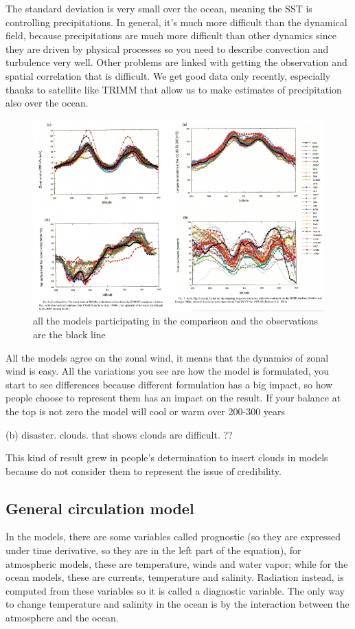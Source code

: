 The standard deviation is very small over the ocean, meaning the SST is controlling precipitations. 
In general, it's much more difficult than the dynamical field, because precipitations are much more difficult than other dynamics since they are driven by physical processes so you need to describe convection and turbulence very well. Other problems are linked with getting the observation and spatial correlation that is difficult. We get good data only recently, especially thanks to satellite like TRIMM that allow us to make estimates of precipitation also over the ocean. 


\begin{figure}[h!]
    \centering
    \includegraphics[width=0.5\linewidth]{uploads/Screenshot 2024-11-20 210633.png}
    \caption{all the models participating in the comparison and the observations are the black line}
    \label{fig:enter-label}
\end{figure}
All the models agree on the zonal wind, it means that the dynamics of zonal wind is easy. All the variations you see are how the model is formulated, you start to see differences because different formulation has a big impact, so how people choose to represent them has an impact on the result. 
If your balance at the top is not zero the model will cool or warm over 200-300 years 

(b) disaster. clouds. that shows clouds are difficult. ??



This kind of result grew in people's determination to insert clouds in models because do not consider them to represent the issue of credibility. 


\subsection{General circulation model }
In the models, there are some variables called prognostic (so they are expressed under time derivative, so they are in the left part of the equation), for atmospheric models, these are temperature, winds and water vapor; while for the ocean models, these are currents, temperature and salinity. Radiation instead, is computed from these variables so it is called a diagnostic variable.
The only way to change temperature and salinity in the ocean is by the interaction between the atmosphere and the ocean. 

